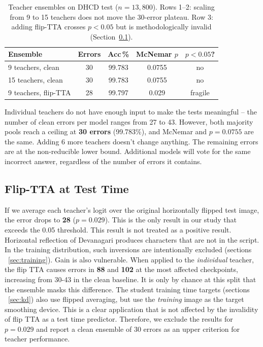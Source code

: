 \begin{table}[t]\centering
\caption{Teacher ensembles on DHCD test ($n{=}13{,}800$). Rows 1--2: scaling from 9 to 15 teachers does not move the 30-error plateau. Row 3: adding flip-TTA crosses $p{<}0.05$ but is methodologically invalid (Section~\ref{sec:flip-tta}).}\label{tab:ensemble}
\begin{tabular}{lcccc}\toprule
Ensemble & Errors & Acc\,\% & McNemar $p$ & $p{<}0.05$? \\\midrule
9 teachers, clean     & 30 & 99.783 & 0.0755 & no \\
15 teachers, clean    & 30 & 99.783 & 0.0755 & no \\
9 teachers, flip-TTA  & 28 & 99.797 & 0.029  & fragile \\\bottomrule
\end{tabular}\end{table}

Individual teachers do not have enough input to make the tests meaningful -- the number of clean errors per model ranges from 27 to 43. However, both majority pools reach a ceiling at \textbf{30 errors} (99.783\%), and McNemar and $p = 0.0755$ are the same. Adding 6 more teachers doesn't change anything. The remaining errors are at the non-reducible lower bound. Additional models will vote for the same incorrect answer, regardless of the number of errors it contains.

\subsection{Flip-TTA at Test Time}
\label{sec:flip-tta}

If we average each teacher's logit over the original horizontally flipped test image, the error drops to \textbf{28} ($p = 0.029$). This is the only result in our study that exceeds the 0.05 threshold. This result is not treated as a positive result. Horizontal reflection of Devanagari produces characters that are not in the script. In the training distribution, such inversions are intentionally excluded (sections ~\ref{sec:training}). Gain is also vulnerable. When applied to the \emph{individual} teacher, the flip TTA causes errors in \textbf{88} and \textbf{102} at the most affected checkpoints, increasing from 30-43 in the clean baseline. It is only by chance at this split that the ensemble masks this difference. The student training time targets (sections ~\ref{sec:kd}) also use flipped averaging, but use the \emph{training} image as the target smoothing device. This is a clear application that is not affected by the invalidity of flip TTA as a test time predictor. Therefore, we exclude the results for $p = 0.029$ and report a clean ensemble of 30 errors as an upper criterion for teacher performance.
